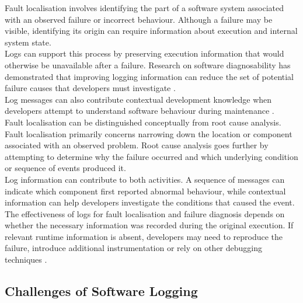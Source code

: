 Fault localisation involves identifying the part of a software system associated with an observed failure or incorrect behaviour.
Although a failure may be visible, identifying its origin can require information about execution and internal system state.
\\
Logs can support this process by preserving execution information that would otherwise be unavailable after a failure. 
Research on software diagnosability has demonstrated that improving logging information can reduce the set
of potential failure causes that developers must investigate \cite{yuan2012improvingsoftwarediagnosibilty}.
\\
Log messages can also contribute contextual development knowledge when developers attempt to 
understand software behaviour during maintenance \cite{shang2014understandingloglinesusingdevelopmentknowledge}.
\\
Fault localisation can be distinguished conceptually from root cause analysis. Fault localisation 
primarily concerns narrowing down the location or component associated with an observed problem. 
Root cause analysis goes further by attempting to determine why the failure occurred and which underlying condition or sequence of events produced it.
\\
Log information can contribute to both activities. A sequence of messages can indicate which 
component first reported abnormal behaviour, while contextual information can help developers investigate the conditions that caused the event.
\\
The effectiveness of logs for fault localisation and failure diagnosis depends 
on whether the necessary information was recorded during the original execution. 
If relevant runtime information is absent, developers may need to reproduce the failure, 
introduce additional instrumentation or rely on other debugging techniques \cite{yuan2012improvingsoftwarediagnosibilty}.

\subsection{Challenges of Software Logging}
\label{subsec:logging_challenges}

